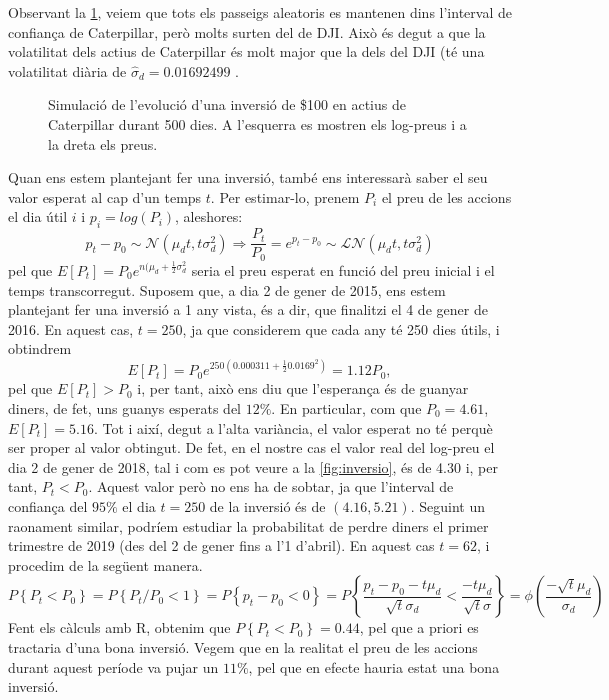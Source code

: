\documentclass{article}
\numberwithin{table}{section}
\numberwithin{figure}{section}
\numberwithin{equation}{section}
\begin{document}
Observant la \cref{fig:simulacio}, veiem que tots els passeigs aleatoris es mantenen dins l'interval de confiança de Caterpillar, però molts surten del de DJI. Això és degut a que la volatilitat dels actius de Caterpillar és molt major que la dels del DJI (té una volatilitat diària de $\hat{\sigma}_d=0.01692499$ .
\begin{figure}[htb]
	\centering \sffamily \small
	
	\caption{Simulació de l'evolució d'una inversió de \$100 en actius de Caterpillar durant 500 dies. A l'esquerra es mostren els log-preus i a la dreta els preus.}
	\label{fig:simulacio}
\end{figure}
Quan ens estem plantejant fer una inversió, també ens interessarà saber el seu valor esperat al cap d’un temps $t$. Per estimar-lo, prenem $P_i$ el preu de les accions el dia útil $i$ i $p_i = log(P_i)$, aleshores:
\begin{equation}
  p_t-p_0\sim \mathcal{N}(\mu_d t, t\sigma_d^2)\Longrightarrow\frac{P_t}{P_0}=e^{p_t-p_0}\sim\mathcal{LN}(\mu_d t, t\sigma_d^2)
\end{equation}
pel que $E[P_t]=P_0e^{n(\mu_d+\frac{1}{2}\sigma_d^2}$ seria el preu esperat en funció del preu inicial i el temps transcorregut.
Suposem que, a dia 2 de gener de 2015, ens estem plantejant fer una inversió a 1 any vista, és a dir, que finalitzi el 4 de gener de 2016. En aquest cas, $t =250$, ja que considerem que cada any té 250 dies útils, i obtindrem
\begin{equation*}
  E[P_t]=P_0e^{250(0.000311+\frac{1}{2}0.0169^2)}=1.12P_0 ,
\end{equation*}
pel que $E[P_t]>P_0$ i, per tant, això ens diu que l’esperança és de guanyar diners, de fet, uns guanys esperats del $12\%$. 
En particular, com que $P_0 = 4.61$, $E[P_t] = 5.16$. Tot i així, degut a l’alta variància, el valor esperat no té perquè ser proper al valor obtingut. De fet, en el nostre cas el valor real del log-preu el dia 2 de gener de 2018, tal i com es pot veure a la \cref{fig:inversio}, és de 4.30 i, per tant, $P_t<P_0$. Aquest valor però no ens ha de sobtar, ja que l'interval de confiança del $95\%$ el dia $t=250$ de la inversió és de  $(4.16,5.21)$.
Seguint un raonament similar, podríem estudiar la probabilitat de perdre diners el primer trimestre de 2019 (des del 2 de gener fins a l'1 d'abril). En aquest cas $t=62$, i procedim de la següent manera.
\begin{equation}
  P\left\{P_t<P_0\right\}=P\left\{P_t/P_0<1\right\}=P\left\{p_t-p_0<0\right\}=P\left\{\frac{p_t-p_0-t\mu_d}{\sqrt{t}\sigma_d}<\frac{-t\mu_d}{\sqrt{t}\sigma}\right\}=\phi\left(\frac{-\sqrt{t}\mu_d}{\sigma_d}\right)
\end{equation}
Fent els càlculs amb R, obtenim que $P\left\{P_t<P_0\right\}=0.44$, pel que a priori es tractaria d'una bona inversió. Vegem que en la realitat el preu de les accions durant aquest període va pujar un $11\%$, pel que en efecte hauria estat una bona inversió.
\end{document}
